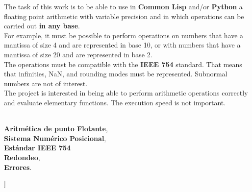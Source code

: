 \documentclass[a4paper,10pt,twocolumn]{article}
\begin{document}
	\begin{enabstract}
		
		The task of this work is to be able to use in \textbf{Common Lisp} and/or \textbf{Python} a floating point arithmetic with variable precision and in which operations can be carried out \textbf{in any base}. \\
		
		For example, it must be possible to perform operations on numbers that have a mantissa of size 4 and are represented in base 10, or with numbers that have a mantissa of size 20 and are represented in base 2.\\
		
		The operations must be compatible with the \textbf{IEEE 754} standard. That means that infinities, NaN, and rounding modes must be represented. Subnormal numbers are not of interest.\\
		
		The project is interested in being able to perform arithmetic operations correctly and evaluate elementary functions. The execution speed is not important.\\
		
	\end{enabstract}
	
	\begin{keywords}
		\\	\textbf{Aritmética de punto Flotante},\\
		\textbf{Sistema Numérico Posicional},\\
		\textbf{Estándar IEEE 754}\\
		\textbf{Redondeo},\\
		\textbf{Errores}.
	\end{keywords}
	
	
	
	
	\vspace{7cm}
	]
	\pagebreak
	
\end{document}
